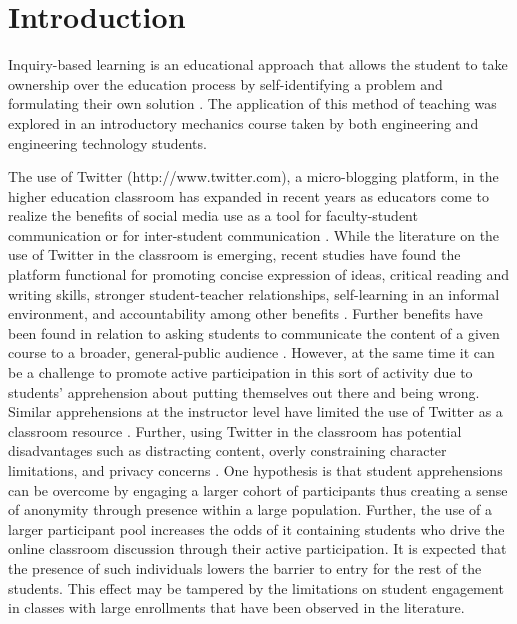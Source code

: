 \documentclass[12pt]{article}
\begin{document}
\section*{Introduction}
Inquiry-based learning is an educational approach that allows the student to take ownership over the education process by self-identifying a problem and formulating their own solution \cite{magnussen_impact_2000, prince_does_2004}. The application of this method of teaching was explored in an introductory mechanics course taken by both engineering and engineering technology students.

The use of Twitter (http://www.twitter.com), a micro-blogging platform, in the higher education classroom has expanded in recent years as educators come to realize the benefits of social media use as a tool for faculty-student communication or for inter-student communication \cite{blessing_using_2012}. While the literature on the use of Twitter in the classroom is emerging, recent studies have found the platform functional for promoting concise expression of ideas, critical reading and writing skills, stronger student-teacher relationships, self-learning in an informal environment, and accountability among other benefits \cite{shiffman_twitter_2012}. Further benefits have been found in relation to asking students to communicate the content of a given course to a broader, general-public audience \cite{junco_effect_2011, ha_influence_2013}. However, at the same time it can be a challenge to promote active participation in this sort of activity due to students’ apprehension about putting themselves out there and being wrong. Similar apprehensions at the instructor level have limited the use of Twitter as a classroom resource \cite{carpenter_how_2014}. Further, using Twitter in the classroom has potential disadvantages such as distracting content, overly constraining character limitations, and privacy concerns \cite{dhir_tweeters_2013}. One hypothesis is that student apprehensions can be overcome by engaging a larger cohort of participants thus creating a sense of anonymity through presence within a large population. Further, the use of a larger participant pool increases the odds of it containing students who drive the online classroom discussion through their active participation. It is expected that the presence of such individuals lowers the barrier to entry for the rest of the students. This effect may be tampered by the limitations on student engagement in classes with large enrollments that have been observed in the literature. \cite{ahlfeldt_measurement_2005}
\end{document}
